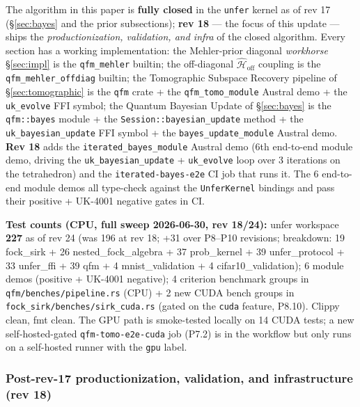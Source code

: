 \documentclass[11pt, a4paper]{article}
\newcommand{\Hgen}{\hat{\mathcal{H}}}
\begin{document}
The algorithm in this paper is \textbf{fully closed} in the
\texttt{unfer} kernel as of rev 17 (\S\ref{sec:bayes} and the
prior subsections); \textbf{rev 18} --- the focus of this
update --- ships the \emph{productionization, validation, and
infra} of the closed algorithm. Every section has a working
implementation: the Mehler-prior diagonal \emph{workhorse}
\S\ref{sec:impl} is the \texttt{qfm\_mehler} builtin; the
off-diagonal $\Hgen_{\mathrm{off}}$ coupling is the
\texttt{qfm\_mehler\_offdiag} builtin; the Tomographic Subspace
Recovery pipeline of \S\ref{sec:tomographic} is the
\texttt{qfm} crate + the \texttt{qfm\_tomo\_module} Austral
demo + the \texttt{uk\_evolve} FFI symbol; the Quantum Bayesian
Update of \S\ref{sec:bayes} is the \texttt{qfm::bayes} module +
the \texttt{Session::bayesian\_update} method + the
\texttt{uk\_bayesian\_update} FFI symbol + the
\texttt{bayes\_update\_module} Austral demo. \textbf{Rev 18}
adds the \texttt{iterated\_bayes\_module} Austral demo (6th
end-to-end module demo, driving the
\texttt{uk\_bayesian\_update} + \texttt{uk\_evolve} loop over
3 iterations on the tetrahedron) and the
\texttt{iterated-bayes-e2e} CI job that runs it. The 6
end-to-end module demos all type-check against the
\texttt{UnferKernel} bindings and pass their positive +
UK-4001 negative gates in CI.

\textbf{Test counts (CPU, full sweep 2026-06-30, rev 18/24):}
unfer workspace \textbf{227} as of rev 24 (was 196 at rev 18; +31 over P8--P10 revisions; breakdown: 19 fock\_sirk + 26
nested\_fock\_algebra + 37 prob\_kernel + 39 unfer\_protocol +
33 unfer\_ffi + 39 qfm + 4 mnist\_validation + 4 cifar10\_validation); 6 module demos
(positive + UK-4001 negative); 4 criterion benchmark groups in
\texttt{qfm/benches/pipeline.rs} (CPU) + 2 new CUDA bench
groups in \texttt{fock\_sirk/benches/sirk\_cuda.rs} (gated on
the \texttt{cuda} feature, P8.10). Clippy clean, fmt clean. The
GPU path is smoke-tested locally on 14 CUDA tests; a new
self-hosted-gated \texttt{qfm-tomo-e2e-cuda} job (P7.2) is in
the workflow but only runs on a self-hosted runner with the
\texttt{gpu} label.

\subsubsection*{Post-rev-17 productionization, validation, and infrastructure (rev 18)}
\end{document}
